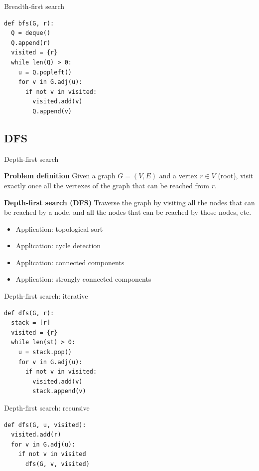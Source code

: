\documentclass[compress]{beamer}
\begin{document}
\begin{frame}[fragile]{Breadth-first search}
\begin{lstlisting}
def bfs(G, r):
  Q = deque()
  Q.append(r)
  visited = {r}
  while len(Q) > 0:
    u = Q.popleft()
    for v in G.adj(u):
      if not v in visited:
        visited.add(v)
        Q.append(v)
\end{lstlisting}
\end{frame}

\subsection{DFS}
\begin{frame}{Depth-first search}
  \begin{block}{\textbf{Problem definition}}
    Given a graph $G = (V, E)$ and a vertex $r \in V$ (root), visit exactly once all the vertexes of the graph that can be reached from $r$.
  \end{block}
  \begin{block}{\textbf{Depth-first search (DFS)}}
    Traverse the graph by visiting all the nodes that can be reached by a node, and all the nodes that can be reached by those nodes, etc.
    \begin{itemize}
    \item Application: topological sort
    \item Application: cycle detection
    \item Application: connected components
    \item Application: strongly connected components
    \end{itemize}
  \end{block}
\end{frame}

\begin{frame}[fragile]{Depth-first search: iterative}
\begin{lstlisting}
def dfs(G, r):
  stack = [r]
  visited = {r}
  while len(st) > 0:
    u = stack.pop()
    for v in G.adj(u):
      if not v in visited:
        visited.add(v)
        stack.append(v)
\end{lstlisting}
\end{frame}

\begin{frame}[fragile]{Depth-first search: recursive}
\begin{lstlisting}
def dfs(G, u, visited):
  visited.add(r)
  for v in G.adj(u):
    if not v in visited
      dfs(G, v, visited)
\end{lstlisting}
\end{frame}
\end{document}
